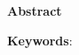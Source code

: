 \begin{center}
\textbf{\large{Abstract}}
\end{center}


\begin{small}


\vspace*{1cm}
\textbf{Keywords}:
\end{small}
